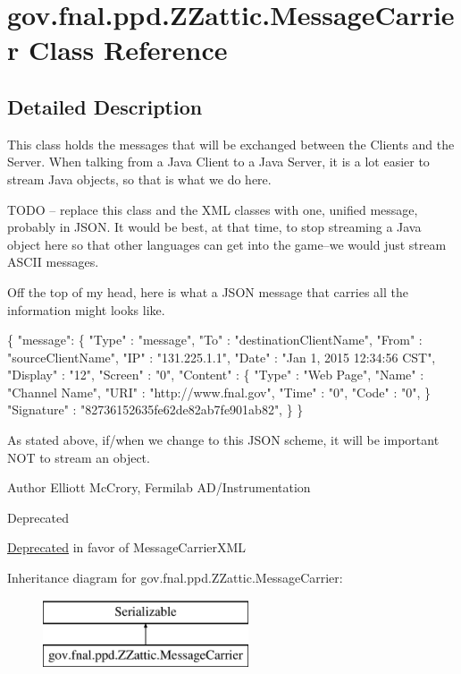\hypertarget{classgov_1_1fnal_1_1ppd_1_1ZZattic_1_1MessageCarrier}{\section{gov.\-fnal.\-ppd.\-Z\-Zattic.\-Message\-Carrier Class Reference}
\label{classgov_1_1fnal_1_1ppd_1_1ZZattic_1_1MessageCarrier}
}


\subsection{Detailed Description}
This class holds the messages that will be exchanged between the Clients and the Server. When talking from a Java Client to a Java Server, it is a lot easier to stream Java objects, so that is what we do here.

T\-O\-D\-O -- replace this class and the X\-M\-L classes with one, unified message, probably in J\-S\-O\-N. It would be best, at that time, to stop streaming a Java object here so that other languages can get into the game--we would just stream A\-S\-C\-I\-I messages.

Off the top of my head, here is what a J\-S\-O\-N message that carries all the information might looks like.


\begin{DoxyPre}
\{ "message": \{
    "Type"    : "message",
    "To"      : "destinationClientName",
    "From"    : "sourceClientName",
    "IP"      : "131.225.1.1",
    "Date"    : "Jan 1, 2015 12:34:56 CST",
    "Display" : "12",
    "Screen"  : "0",
    "Content" : \{
            "Type" : "Web Page",
         "Name" : "Channel Name",
         "URI"  : "http://www.fnal.gov",
         "Time" : "0",
         "Code" : "0",         
    \}
    "Signature" : "82736152635fe62de82ab7fe901ab82",
  \}
\}
\end{DoxyPre}


As stated above, if/when we change to this J\-S\-O\-N scheme, it will be important N\-O\-T to stream an object.

\begin{DoxyAuthor}{Author}
Elliott Mc\-Crory, Fermilab A\-D/\-Instrumentation
\end{DoxyAuthor}
\begin{DoxyRefDesc}{Deprecated}
\item[\hyperlink{deprecated__deprecated000014}{Deprecated}]in favor of Message\-Carrier\-X\-M\-L \end{DoxyRefDesc}
Inheritance diagram for gov.\-fnal.\-ppd.\-Z\-Zattic.\-Message\-Carrier\-:\begin{figure}[H]
\begin{center}
\leavevmode
\includegraphics[height=2.000000cm]{classgov_1_1fnal_1_1ppd_1_1ZZattic_1_1MessageCarrier}
\end{center}
\end{figure}
